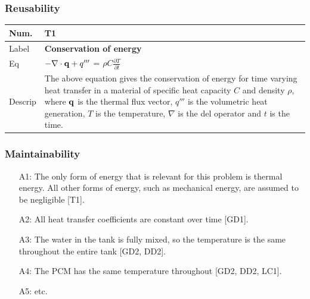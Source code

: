 \documentclass{beamer}
\newcommand{\colAwidth}{0.1\textwidth}
\newcommand{\colBwidth}{0.8\textwidth}
\begin{document}

\begin{frame}

\frametitle{Reusability}

\noindent
\begin{minipage}{\columnwidth}
\begin{tabular}{@{} p{\colAwidth}  p{\colBwidth}@{}}
\toprule
\textbf{Num.}& \textbf{T1} \\
\midrule
Label &\bf Conservation of energy\\
\midrule
Eq &  $-{\bf \nabla \cdot q} +q'''$ = $\rho C \frac{\partial T}{\partial t}$ \smallskip\\
\midrule
Descrip & The above equation gives the conservation of energy for time 
varying heat transfer in a material of specific heat capacity $C$ and density $\rho$,
where $\bf q$ is the thermal flux vector, $q'''$ is the volumetric heat
generation, $T$ is the temperature, $\nabla$ is the del operator and $t$ is the time.\\
\bottomrule
\end{tabular}
\end{minipage}

\end{frame}


\begin{frame}

\frametitle{Maintainability}

\begin{itemize}

\item[A1:] The
  only form of energy that is relevant for this problem is thermal energy.  All
  other forms of energy, such as mechanical energy, are assumed to be
  negligible [T1].

\item[A2:] All heat transfer coefficients are constant over time [GD1].

\item[A3:] The water in
  the tank is fully mixed, so the temperature is the same throughout the entire
  tank [GD2, DD2].

\item[A4:] The PCM has the same temperature throughout [GD2, DD2, LC1].

\item[A5:] etc.

\end{itemize}

\end{frame}
\end{document}
